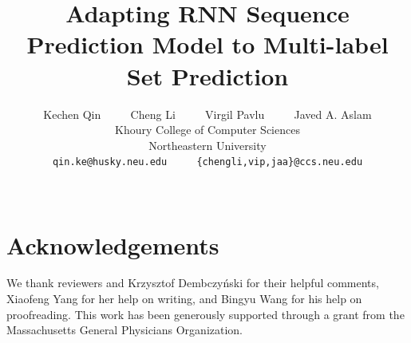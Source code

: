 \documentclass[11pt,a4paper]{article}
\title{Adapting RNN Sequence Prediction Model to Multi-label Set Prediction}
\author{Kechen Qin ~~~~ Cheng Li ~~~~ Virgil Pavlu ~~~~ Javed A. Aslam\\
  Khoury College of Computer Sciences \\
  Northeastern University\\
{\tt qin.ke@husky.neu.edu} ~~~~ {\tt \{chengli,vip,jaa\}@ccs.neu.edu}\\
   \\}
\date{}
\begin{document}
\maketitle
\begin{abstract}

\end{abstract}


% 







\section{Acknowledgements}
We thank reviewers and Krzysztof Dembczyński for their helpful comments,
Xiaofeng Yang for her help on writing, and Bingyu Wang for his help on proofreading. This work has been generously supported through a grant from the Massachusetts General Physicians Organization.
% 
\clearpage
\newpage




\appendix
\end{document}
